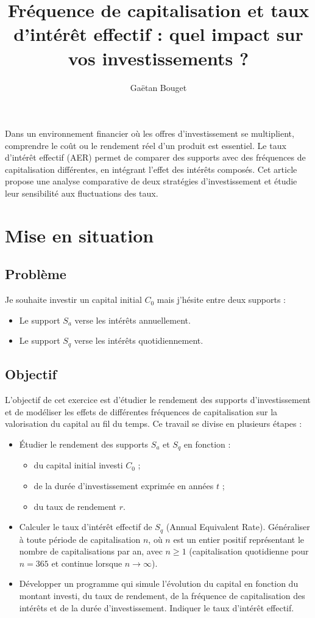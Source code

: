 \documentclass{article}
\title{Fréquence de capitalisation et taux d'intérêt effectif : quel impact sur vos investissements ?}
\author{Gaëtan Bouget}
\begin{document}
\maketitle

Dans un environnement financier où les offres d’investissement se multiplient, comprendre le coût ou le rendement réel d’un produit est essentiel. Le taux d’intérêt effectif (AER) permet de comparer des supports avec des fréquences de capitalisation différentes, en intégrant l’effet des intérêts composés. Cet article propose une analyse comparative de deux stratégies d’investissement et étudie leur sensibilité aux fluctuations des taux.

\section{Mise en situation}
\subsection{Problème}
Je souhaite investir un capital initial $C_0$ mais j'hésite entre deux supports :
\begin{itemize}
\item Le support $S_a$ verse les intérêts annuellement.
\item Le support $S_q$  verse les intérêts quotidiennement.
\end{itemize}

\subsection{Objectif}
L'objectif de cet exercice est d'étudier le rendement des supports d'investissement et de modéliser les effets de différentes fréquences de capitalisation sur la valorisation du capital au fil du temps. Ce travail se divise en plusieurs étapes :

\begin{itemize}
    \item Étudier le rendement des supports $S_a$ et $S_q$ en fonction :
    \begin{itemize}
        \item du capital initial investi $C_0$ ;
        \item de la durée d'investissement exprimée en années $t$ ;
        \item du taux de rendement $r$.
    \end{itemize}
    \item Calculer le taux d'intérêt effectif de $S_q$ (Annual Equivalent Rate). Généraliser à toute période de capitalisation $n$, où $n$ est un entier positif représentant le nombre de capitalisations par an, avec $n \geq 1$ (capitalisation quotidienne pour $n = 365$ et continue lorsque $n \to \infty$).
    \item Développer un programme qui simule l'évolution du capital en fonction du montant investi, du taux de rendement, de la fréquence de capitalisation des intérêts et de la durée d'investissement. Indiquer le taux d'intérêt effectif.
\end{itemize}
\end{document}
